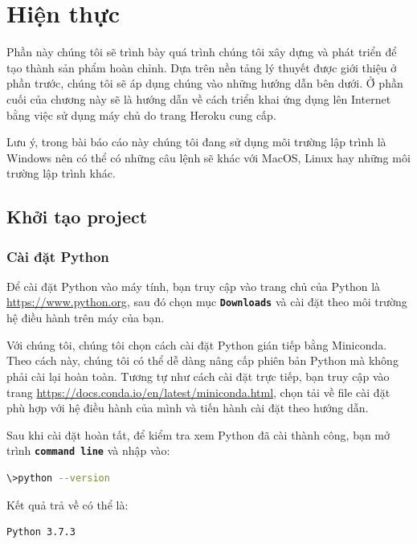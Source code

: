 \chapter{Hiện thực}
Phần này chúng tôi sẽ trình bày quá trình chúng tôi xây dựng và phát triển để tạo thành sản phẩm hoàn chỉnh. Dựa trên nền tảng lý thuyết được giới thiệu ở phần trước, chúng tôi sẽ áp dụng chúng vào những hướng dẫn bên dưới. Ở phần cuối của chương này sẽ là hướng dẫn về cách triển khai ứng dụng lên Internet bằng việc sử dụng máy chủ do trang Heroku cung cấp.
\par
Lưu ý, trong bài báo cáo này chúng tôi đang sử dụng môi trường lập trình là Windows nên có thể có những câu lệnh sẽ khác với MacOS, Linux hay những môi trường lập trình khác.
\section{Khởi tạo project}
\subsection{Cài đặt Python}
Để cài đặt Python vào máy tính, bạn truy cập vào trang chủ của Python là \url{https://www.python.org}, sau đó chọn mục \textbf{\texttt{Downloads}} và cài đặt theo môi trường hệ điều hành trên máy của bạn.
\par
Với chúng tôi, chúng tôi chọn cách cài đặt Python gián tiếp bằng Miniconda. Theo cách này, chúng tôi có thể dễ dàng nâng cấp phiên bản Python mà không phải cài lại hoàn toàn. Tương tự như cách cài đặt trực tiếp, bạn truy cập vào trang \url{https://docs.conda.io/en/latest/miniconda.html}, chọn tải về file cài đặt phù hợp với hệ điều hành của mình và tiến hành cài đặt theo hướng dẫn.
\par
Sau khi cài đặt hoàn tất, để kiểm tra xem Python đã cài thành công, bạn mở trình \textbf{\texttt{command line}} và nhập vào:
\begin{lstlisting}[language=bash]
\>python --version
\end{lstlisting}
\par
Kết quả trả về có thể là:
\begin{lstlisting}
Python 3.7.3
\end{lstlisting}
